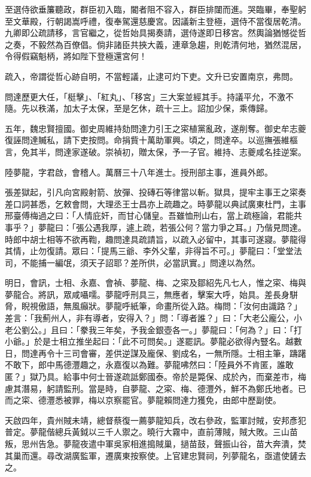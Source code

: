 \begin{pinyinscope}
至選侍欲垂簾聽政，群臣初入臨，閽者阻不容入，群臣排闥而進。哭臨畢，奉聖躬至文華殿，行朝謁嵩呼禮，復奉駕還慈慶宮。因議新主登極，選侍不當復居乾清。九卿即公疏請移，言官繼之，從哲始具揭奏請，選侍遂即日移宮。然輿論猶憾從哲之奏，不毅然為百僚倡。倘非諸臣共挾大義，連章急趨，則乾清何地，猶然混居，令得假竊魁柄，將如陛下登極還宮何！

疏入，帝謂從哲心跡自明，不當輕議，止逮可灼下吏。文升已安置南京，弗問。

問達歷更大任，「梃擊」、「紅丸」、「移宮」三大案並經其手。持議平允，不激不隨。先以秩滿，加太子太保，至是乞休，疏十三上。詔加少保，乘傳歸。

五年，魏忠賢擅國。御史周維持劾問達力引王之寀植黨亂政，遂削奪。御史牟志夔復誣問達贓私，請下吏按問。命捐貲十萬助軍興。頃之，問達卒。以巡撫張維樞言，免其半，問達家遂破。崇禎初，贈太保，予一子官。維持、志夔咸名挂逆案。

陸夢龍，字君啟，會稽人。萬曆三十八年進士。授刑部主事，進員外郎。

張差獄起，引凡向宮殿射箭、放彈、投磚石等律當以斬。獄具，提牢主事王之寀奏差口詞甚悉，乞敕會問，大理丞王士昌亦上疏趣之。時夢龍以典試廣東杜門，主事邢臺傅梅過之曰：「人情庇奸，而甘心儲皇。吾雖恤刑山右，當上疏極論，君能共事乎？」夢龍曰：「張公遇我厚，遽上疏，若張公何？當力爭之耳。」乃偕見問達。時郎中胡士相等不欲再鞫，趣問達具疏請旨，以疏入必留中，其事可遂寢。夢龍得其情，止勿復請。眾曰：「提馬三爺、李外父輩，非得旨不可。」夢龍曰：「堂堂法司，不能捕一編氓，須天子詔耶？差所供，必當訊實。」問達以為然。

明日，會訊，士相、永嘉、會禎、夢龍、梅、之寀及鄒紹先凡七人，惟之寀、梅與夢龍合。將訊，眾咸囁嚅。夢龍呼刑具三，無應者，擊案大呼，始具。差長身駢脅，睨視傲語，無風癲狀。夢龍呼紙筆，命畫所從入路。梅問：「汝何由識路？」差言：「我薊州人，非有導者，安得入？」問：「導者誰？」曰：「大老公龐公，小老公劉公。」且曰：「豢我三年矣，予我金銀壺各一。」夢龍曰：「何為？」曰：「打小爺。」於是士相立推坐起曰：「此不可問矣。」遂罷訊。夢龍必欲得內豎名。越數日，問達再令十三司會審，差供逆謀及龐保、劉成名，一無所隱。士相主筆，躊躇不敢下，郎中馬德灃趣之，永嘉復以為難。夢龍咈然曰：「陸員外不肯匿，誰敢匿？」獄乃具。給事中何士晉遂疏詆鄭國泰。帝於是斃保、成於內，而棄差市，梅慮其潛易，躬請監刑。當是時，自夢龍、之寀、梅、德灃外，鮮不為鄭氏地者。已而之寀、德灃悉被罪，梅以京察罷官。夢龍賴問達力獲免，由郎中歷副使。

天啟四年，貴州賊未靖，總督蔡復一薦夢龍知兵，改右參政，監軍討賊，安邦彥犯普定。夢龍偕總兵黃鉞以三千人禦之。曉行大霧中，直前薄賊，賊大敗。三山苗叛，思州告急。夢龍夜遣中軍吳家相進搗賊巢，撾苗鼓，聲振山谷，苗大奔潰，焚其巢而還。尋改湖廣監軍，遷廣東按察使。上官建忠賢祠，列夢龍名，亟遣使鏟去之。


\end{pinyinscope}
